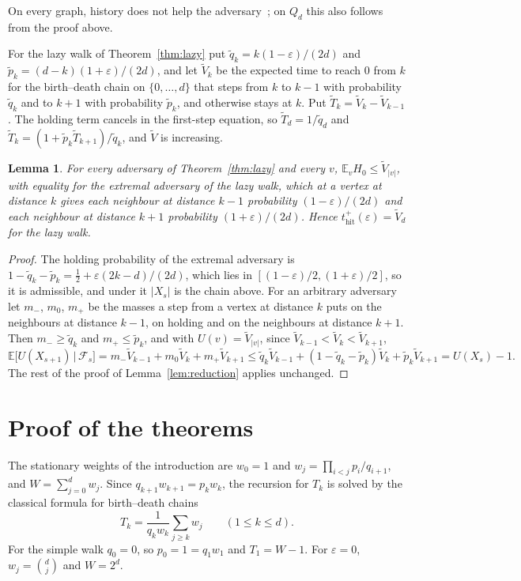 \documentclass[11pt]{amsart}
\newtheorem{lemma}[theorem]{Lemma}
\theoremstyle{remark}
\newcommand{\eps}{\varepsilon}
\newcommand{\E}{\mathbb{E}}
\newcommand{\thit}{t_{\mathrm{hit}}}
\begin{document}
On every graph, history does not help the adversary~\cite[Section~1.4]{Zuc26}; on $Q_d$ this also follows from the
proof above.

For the lazy walk of Theorem~\ref{thm:lazy} put $\tilde q_k=k(1-\eps)/(2d)$ and $\tilde p_k=(d-k)(1+\eps)/(2d)$, and let
$\tilde V_k$ be the expected time to reach $0$ from $k$ for the birth--death chain on $\{0,\dots,d\}$ that steps from
$k$ to $k-1$ with probability $\tilde q_k$ and to $k+1$ with probability $\tilde p_k$, and otherwise stays at $k$. Put
$\tilde T_k=\tilde V_k-\tilde V_{k-1}$. The holding term cancels in the first-step equation, so
$\tilde T_d=1/\tilde q_d$ and $\tilde T_k=(1+\tilde p_k\tilde T_{k+1})/\tilde q_k$, and $\tilde V$ is increasing.

\begin{lemma}\label{lem:lazy}
For every adversary of Theorem~\ref{thm:lazy} and every $v$, $\E_vH_0\le\tilde V_{|v|}$, with equality for the
extremal adversary of the lazy walk, which at a vertex at distance $k$ gives each neighbour at distance $k-1$ probability $(1-\eps)/(2d)$ and each
neighbour at distance $k+1$ probability $(1+\eps)/(2d)$. Hence $\thit^+(\eps)=\tilde V_d$ for the lazy walk.
\end{lemma}

\begin{proof}
The holding probability of the extremal adversary is $1-\tilde q_k-\tilde p_k=\tfrac12+\eps(2k-d)/(2d)$, which lies in
$[(1-\eps)/2,(1+\eps)/2]$, so it is admissible, and under it $|X_s|$ is the chain above. For an arbitrary adversary
let $m_-$, $m_0$, $m_+$ be the masses a step from a vertex at distance $k$ puts on the neighbours at distance $k-1$, on
holding and on the neighbours at distance $k+1$. Then $m_-\ge\tilde q_k$ and $m_+\le\tilde p_k$, and with
$U(v)=\tilde V_{|v|}$, since $\tilde V_{k-1}<\tilde V_k<\tilde V_{k+1}$,
\[
\E\bigl[U(X_{s+1})\,\big|\,\mathcal F_s\bigr]=m_-\tilde V_{k-1}+m_0\tilde V_k+m_+\tilde V_{k+1}
\le\tilde q_k\tilde V_{k-1}+(1-\tilde q_k-\tilde p_k)\tilde V_k+\tilde p_k\tilde V_{k+1}=U(X_s)-1 .
\]
The rest of the proof of Lemma~\ref{lem:reduction} applies unchanged.
\end{proof}

\section{Proof of the theorems}\label{sec:proof}

The stationary weights of the introduction are $w_0=1$ and $w_j=\prod_{i<j}p_i/q_{i+1}$, and $W=\sum_{j=0}^dw_j$. Since $q_{k+1}w_{k+1}=p_kw_k$, the recursion for
$T_k$ is solved by the classical formula for birth--death chains~\cite[Section~2.5]{LPW17}
\begin{equation}\label{eq:Tk}
T_k=\frac{1}{q_kw_k}\sum_{j\ge k}w_j\qquad(1\le k\le d).
\end{equation}
For the simple walk $q_0=0$, so $p_0=1=q_1w_1$ and $T_1=W-1$. For $\eps=0$, $w_j=\binom dj$ and $W=2^d$.
\end{document}
